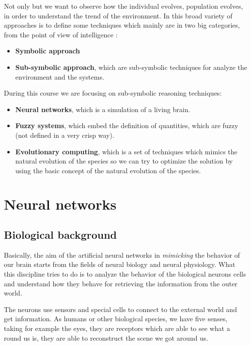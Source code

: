 \documentclass{article}
\begin{document}
Not only but we want to observe how the individual evolves, population evolves, in order to understand the trend
of the environment. In this broad variety of approaches is to define some techniques which mainly are
in two big categories, from the point of view of intelligence :

\begin{itemize}
    \item \textbf{Symbolic approach}
    \item \textbf{Sub-symbolic approach}, which are sub-symbolic techniques for analyze the environment
          and the systems.
\end{itemize}

During this course we are focusing on sub-symbolic reasoning techniques:
\begin{itemize}
    \item \textbf{Neural networks}, which is a simulation of a living brain.
    \item \textbf{Fuzzy systems}, which embed the definition of quantities, which are fuzzy (not defined
          in a very crisp way).
    \item \textbf{Evolutionary computing}, which is a set of techniques which mimics the natural evolution of the
          species so we can try to optimize the solution by using the basic concept of the natural evolution of the species.
\end{itemize}


\section{Neural networks}
\subsection{Biological background}
Basically, the aim of the artificial neural networks in \textit{mimicking} the behavior of our brain starts
from the fields of neural biology and neural physiology. What this discipline tries to do is to analyze the
behavior of the biological neurons cells and understand how they behave for retrieving
the information from the outer world.

The neurons use sensors and special cells to connect to the external world and get information.
As humans or other biological species, we have five senses, taking for example the eyes, they are receptors
which are able to see what a round us is, they are able to reconstruct the scene we got around us.
\end{document}
